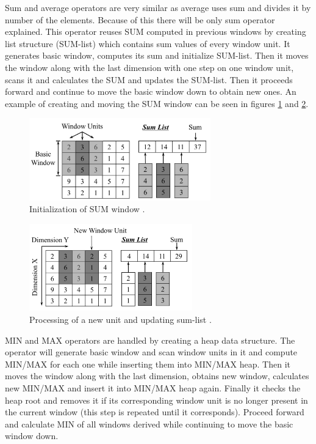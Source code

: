 Sum and average operators are very similar as average uses sum and divides it by number of the elements. Because of this there will be only sum operator explained. This operator reuses SUM computed in previous windows by creating list structure (SUM-list) which contains sum values of every window unit. It generates basic window, computes its sum and initialize SUM-list. Then it moves the window along with the last dimension with one step on one window unit, scans it and calculates the SUM and updates the SUM-list. Then it proceeds forward and continue to move the basic window down to obtain new ones. An example of creating and moving the SUM window can be seen in figures \ref{windowAM1} and \ref{windowAM2}.

\begin{figure}
\centering
\includegraphics[width=0.7\textwidth]{windowAM_sum1.PNG}
\caption{Initialization of SUM window \cite{windowAggr}.}
\label{windowAM1}
\end{figure}

\begin{figure}
\centering
\includegraphics[width=0.63\textwidth]{windowAM_sum2.PNG}
\caption{Processing of a new unit and updating sum-list \cite{windowAggr}.}
\label{windowAM2}
\end{figure}

MIN and MAX operators are handled by creating a heap data structure. The operator will generate basic window and scan window units in it and compute MIN/MAX for each one while inserting them into MIN/MAX heap. Then it moves the window along with the last dimension, obtains new window, calculates new MIN/MAX and insert it into MIN/MAX heap again. Finally it checks the heap root and removes it if its corresponding window unit is no longer present in the current window (this step is repeated until it corresponds). Proceed forward and calculate MIN of all windows derived while continuing to move the basic window down.

